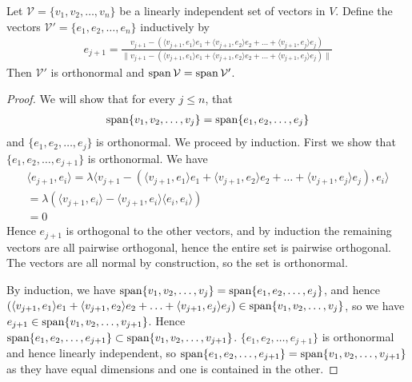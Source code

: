 \documentclass[]{article}
\begin{document}
\begin{thm} 
		Let $\mathcal{V} = \{v_1, v_2, \ldots, v_n\}$ be a linearly independent set of vectors in $V$. Define the vectors $\mathcal{V}' = \{e_1, e_2, \ldots, e_n\}$ inductively by
	\begin{align*}
			e_{j+1} = \frac{v_{j+1} - (\langle v_{j+1}, e_1 \rangle e_1 + \langle v_{j+1}, e_2 \rangle e_2 + \ldots + \langle v_{j+1}, e_j \rangle e_j)}{\|v_{j+1} - (\langle v_{j+1}, e_1 \rangle e_1 + \langle v_{j+1}, e_2 \rangle e_2 + \ldots + \langle v_{j+1}, e_j \rangle e_j)\|}
	\end{align*}
	Then $\mathcal{V}'$ is orthonormal and $\operatorname{span} \mathcal{V} = \operatorname{span} \mathcal{V}'$.
\end{thm}

\begin{proof}
		We will show that for every $j \leq n$, that 
		\begin{align*}
		\operatorname{span}\{v_1, v_2, \ldots, v_j\} = \operatorname{span}\{e_1, e_2, \ldots, e_j\}
		\end{align*}
		and $\{e_1, e_2, \ldots, e_j\}$ is orthonormal. We proceed by induction. First we show that $\{e_1, e_2, \ldots, e_{j+1}\}$ is orthonormal. We have
		\begin{align*}
				\langle e_{j+1}, e_i \rangle = \lambda \langle v_{j+1} - (\langle v_{j+1}, e_1 \rangle e_1 + \langle v_{j+1}, e_2 \rangle e_2 + \ldots + \langle v_{j+1}, e_j \rangle e_j), e_i \rangle\\
				= \lambda(\langle v_{j+1}, e_i \rangle - \langle v_{j+1}, e_i \rangle \langle e_i, e_i \rangle ) \\
				= 0
		\end{align*}
		Hence $e_{j+1}$ is orthogonal to the other vectors, and by induction the remaining vectors are all pairwise orthogonal, hence the entire set is pairwise orthogonal. The vectors are all normal by construction, so the set is orthonormal.

		By induction, we have $\operatorname{span}\{v_1, v_2, \ldots, v_j\} = \operatorname{span}\{e_1, e_2, \ldots, e_j\}$, and hence $(\langle v_{j+1}, e_1 \rangle e_1 + \langle v_{j+1}, e_2 \rangle e_2 + \ldots + \langle v_{j+1}, e_j \rangle e_j) \in \operatorname{span}\{v_1, v_2, \ldots, v_j\}$, so we have $e_{j+1} \in \operatorname{span}\{v_1, v_2, \ldots, v_{j+1}\}$. Hence $\operatorname{span}\{e_1, e_2, \ldots, e_{j+1}\} \subset \operatorname{span}\{v_1,v_2, \ldots, v_{j+1}\}$. $\{e_1, e_2, \ldots, e_{j+1}\}$ is orthonormal and hence linearly independent, so $\operatorname{span}\{e_1, e_2, \ldots, e_{j+1}\} = \operatorname{span}\{v_1,v_2, \ldots, v_{j+1}\}$ as they have equal dimensions and one is contained in the other.
\end{proof}
\end{document}
